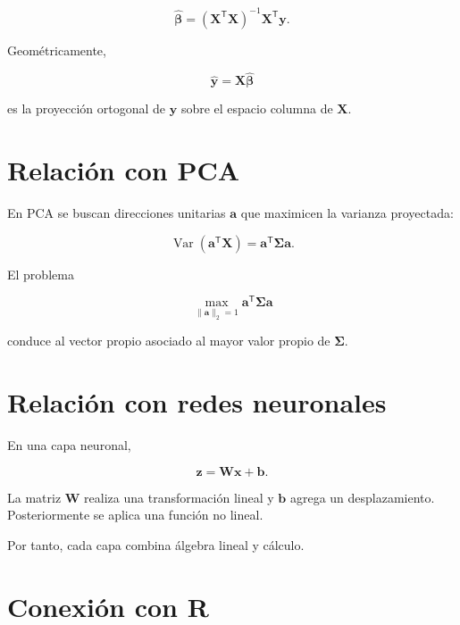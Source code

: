 \documentclass[
  spanish,
  10.5pt,
  letterpaper,
  DIV=11,
  numbers=noendperiod,
  oneside,
  open=any]{scrreprt}
\theoremstyle{definition}
\theoremstyle{definition}
\theoremstyle{plain}
\theoremstyle{remark}
\begin{document}
\[
\widehat{\boldsymbol{\beta}}
=
(\mathbf{X}^{\mathsf T}\mathbf{X})^{-1}
\mathbf{X}^{\mathsf T}\mathbf{y}.
\]

Geométricamente,

\[
\widehat{\mathbf{y}}
=
\mathbf{X}
\widehat{\boldsymbol{\beta}}
\]

es la proyección ortogonal de \(\mathbf{y}\) sobre el espacio columna de
\(\mathbf{X}\).

\section*{Relación con PCA}\label{relaciuxf3n-con-pca}


En PCA se buscan direcciones unitarias \(\mathbf{a}\) que maximicen la
varianza proyectada:

\[
\operatorname{Var}
(
\mathbf{a}^{\mathsf T}\mathbf{X}
)
=
\mathbf{a}^{\mathsf T}
\boldsymbol{\Sigma}
\mathbf{a}.
\]

El problema

\[
\max_{\|\mathbf{a}\|_2=1}
\mathbf{a}^{\mathsf T}
\boldsymbol{\Sigma}
\mathbf{a}
\]

conduce al vector propio asociado al mayor valor propio de
\(\boldsymbol{\Sigma}\).

\section*{Relación con redes
neuronales}\label{relaciuxf3n-con-redes-neuronales}


En una capa neuronal,

\[
\mathbf{z}
=
\mathbf{W}\mathbf{x}
+
\mathbf{b}.
\]

La matriz \(\mathbf{W}\) realiza una transformación lineal y
\(\mathbf{b}\) agrega un desplazamiento. Posteriormente se aplica una
función no lineal.

Por tanto, cada capa combina álgebra lineal y cálculo.

\section*{Conexión con R}\label{conexiuxf3n-con-r-1}

\end{document}
